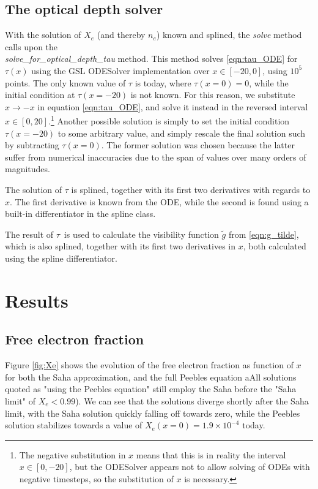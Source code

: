\documentclass[10pt, a4paper]{article}
\begin{document}
\subsection{The optical depth solver}
With the solution of $X_e$ (and thereby $n_e$) known and splined, the \textit{solve} method calls upon the\\
\textit{solve\_for\_optical\_depth\_tau} method. This method solves \ref{eqn:tau_ODE} for $\tau(x)$ using the GSL ODESolver implementation over $x\in[-20, 0]$, using $10^5$ points. The only known value of $\tau$ is today, where $\tau(x=0) = 0$, while the initial condition at $\tau(x=-20)$ is not known. For this reason, we substitute $x \rightarrow -x$ in equation \ref{eqn:tau_ODE}, and solve it instead in the reversed interval $x\in[0, 20]$.\footnote{The negative substitution in $x$ means that this is in reality the interval $x\in [0, -20]$, but the ODESolver appears not to allow solving of ODEs with negative timesteps, so the substitution of $x$ is necessary.} Another possible solution is simply to set the initial condition $\tau(x=-20)$ to some arbitrary value, and simply rescale the final solution such by subtracting $\tau(x=0)$. The former solution was chosen because the latter suffer from numerical inaccuracies due to the span of values over many orders of magnitudes.

The solution of $\tau$ is splined, together with its first two derivatives with regards to $x$. The first derivative is known from the ODE, while the second is found using a built-in differentiator in the spline class.

The result of $\tau$ is used to calculate the visibility function $\tilde{g}$ from \ref{eqn:g_tilde}, which is also splined, together with its first two derivatives in $x$, both calculated using the spline differentiator.



\section{Results}
\subsection{Free electron fraction}
Figure \ref{fig:Xe} shows the evolution of the free electron fraction as function of $x$ for both the Saha approximation, and the full Peebles equation aAll solutions quoted as "using the Peebles equation" still employ the Saha before the "Saha limit" of $X_e < 0.99$). We can see that the solutions diverge shortly after the Saha limit, with the Saha solution quickly falling off towards zero, while the Peebles solution stabilizes towards a value of $X_e(x=0) = 1.9\times 10^{-4}$ today.
\end{document}
